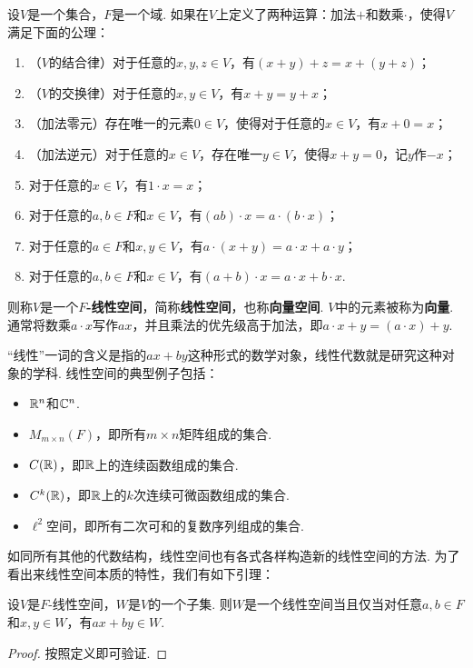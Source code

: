 \begin{definition}
设$V$是一个集合，$F$是一个域. 如果在$V$上定义了两种运算：加法$+$和数乘$\cdot$，使得$V$满足下面的公理：
\begin{enumerate}
    \item （$V$的结合律）对于任意的$x,y,z\in V$，有$(x+y)+z=x+(y+z)$；
    \item （$V$的交换律）对于任意的$x,y\in V$，有$x+y=y+x$；
    \item （加法零元）存在唯一的元素$0\in V$，使得对于任意的$x\in V$，有$x+0=x$；
    \item （加法逆元）对于任意的$x\in V$，存在唯一$y\in V$，使得$x+y=0$，记$y$作$-x$；
    \item 对于任意的$x\in V$，有$1\cdot x=x$；
    \item 对于任意的$a,b\in F$和$x\in V$，有$(ab)\cdot x=a\cdot (b\cdot x)$；
    \item 对于任意的$a\in F$和$x,y\in V$，有$a\cdot(x+y)=a\cdot x+a\cdot y$；
    \item 对于任意的$a,b\in F$和$x\in V$，有$(a+b)\cdot x=a\cdot x+b\cdot x$. 
\end{enumerate}
则称$V$是一个\textbf{$F$-线性空间}，简称\textbf{线性空间}，也称\textbf{向量空间}. $V$中的元素被称为\textbf{向量}. 通常将数乘$a\cdot x$写作$ax$，并且乘法的优先级高于加法，即$a\cdot x+y=(a\cdot x)+y$. 
\end{definition}

“线性”一词的含义是指的$ax+by$这种形式的数学对象，线性代数就是研究这种对象的学科. 线性空间的典型例子包括：
\begin{itemize}
    \item $\mathbb{R}^n$和$\mathbb{C}^n$.
    \item $M_{m\times n}(F)$，即所有$m\times n$矩阵组成的集合.
    \item $C(\mathbb{R})$，即$\mathbb{R}$上的连续函数组成的集合.
    \item $C^k(\mathbb{R})$，即$\mathbb{R}$上的$k$次连续可微函数组成的集合.
    \item $\ell^2$空间，即所有二次可和的复数序列组成的集合.
\end{itemize}

如同所有其他的代数结构，线性空间也有各式各样构造新的线性空间的方法. 为了看出来线性空间本质的特性，我们有如下引理：

\begin{lemma}\label{lemma:linear-space-subspace}
设$V$是$F$-线性空间，$W$是$V$的一个子集. 则$W$是一个线性空间当且仅当对任意$a,b\in F$和$x,y\in W$，有$ax+by\in W$. 
\end{lemma}
\begin{proof}
    按照定义即可验证. 
\end{proof}

